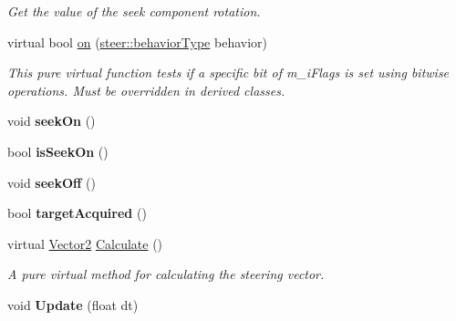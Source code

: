 \begin{DoxyCompactItemize}
\begin{DoxyCompactList}\small\item\em Get the value of the seek component rotation. \end{DoxyCompactList}\item 
virtual bool \hyperlink{classsteer_1_1_seek_component_a02782af7638a7dfc59de647ba810d0ae}{on} (\hyperlink{namespacesteer_afe6e72f8f8088962727051501181acbe}{steer\-::behavior\-Type} behavior)
\begin{DoxyCompactList}\small\item\em This pure virtual function tests if a specific bit of m\-\_\-i\-Flags is set using bitwise operations. Must be overridden in derived classes. \end{DoxyCompactList}\item 
\hypertarget{classsteer_1_1_seek_component_a93ff3518a3f6889ff98a8eb986098b8d}{void {\bfseries seek\-On} ()}\label{classsteer_1_1_seek_component_a93ff3518a3f6889ff98a8eb986098b8d}

\item 
\hypertarget{classsteer_1_1_seek_component_ad219116f6dd2b4edbedb613e510c85a7}{bool {\bfseries is\-Seek\-On} ()}\label{classsteer_1_1_seek_component_ad219116f6dd2b4edbedb613e510c85a7}

\item 
\hypertarget{classsteer_1_1_seek_component_a3d8d434aad5cc50f447a014a11bd74f3}{void {\bfseries seek\-Off} ()}\label{classsteer_1_1_seek_component_a3d8d434aad5cc50f447a014a11bd74f3}

\item 
\hypertarget{classsteer_1_1_seek_component_ac8c43fcaec1220eb23123563787411c0}{bool {\bfseries target\-Acquired} ()}\label{classsteer_1_1_seek_component_ac8c43fcaec1220eb23123563787411c0}

\item 
\hypertarget{classsteer_1_1_seek_component_afdf0d958f5b51deb07ec1e6c9c30fb6b}{virtual \hyperlink{structsteer_1_1_vector2}{Vector2} \hyperlink{classsteer_1_1_seek_component_afdf0d958f5b51deb07ec1e6c9c30fb6b}{Calculate} ()}\label{classsteer_1_1_seek_component_afdf0d958f5b51deb07ec1e6c9c30fb6b}

\begin{DoxyCompactList}\small\item\em A pure virtual method for calculating the steering vector. \end{DoxyCompactList}\item 
\hypertarget{classsteer_1_1_seek_component_a1121c7588fd4071fbf08bbe4164d3a23}{void {\bfseries Update} (float dt)}\label{classsteer_1_1_seek_component_a1121c7588fd4071fbf08bbe4164d3a23}

\end{DoxyCompactItemize}
